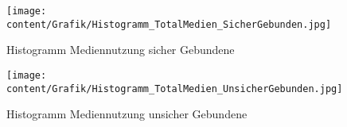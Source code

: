 
\begin{figure}[h]
  \centering
     \texttt{[image: content/Grafik/Histogramm\_TotalMedien\_SicherGebunden.jpg]}
  \caption{Histogramm Mediennutzung sicher Gebundene}
  \label{fig:AppHistogrammSicherGebunden}
\end{figure}
\begin{figure}[h]
  \centering
     \texttt{[image: content/Grafik/Histogramm\_TotalMedien\_UnsicherGebunden.jpg]}
  \caption{Histogramm Mediennutzung unsicher Gebundene}
  \label{fig:AppHistogrammUnsicherGebunden}
\end{figure}




